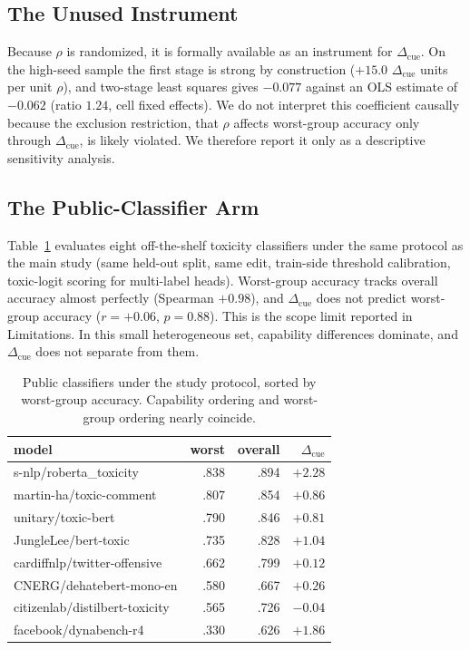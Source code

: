 \documentclass[11pt]{article}
\newcommand{\cued}{\ensuremath{\Delta_{\mathrm{cue}}}}
\begin{document}
\subsection{The Unused Instrument}
\label{app:iv}
Because $\rho$ is randomized, it is formally available as an instrument for
\cued{}. On the high-seed sample the first stage is strong by construction
($+15.0$ \cued{} units per unit $\rho$), and two-stage least squares gives
$-0.077$ against an OLS estimate of $-0.062$ (ratio $1.24$, cell fixed
effects). We do not interpret this coefficient causally because the exclusion
restriction, that $\rho$ affects worst-group accuracy only through \cued{}, is
likely violated. We therefore report it only as a descriptive sensitivity
analysis.

\subsection{The Public-Classifier Arm}
\label{app:public}
Table~\ref{tab:public} evaluates eight off-the-shelf toxicity classifiers
under the same protocol as the main study (same held-out split, same edit,
train-side threshold calibration, toxic-logit scoring for multi-label heads).
Worst-group accuracy tracks overall accuracy almost perfectly
(Spearman $+0.98$), and \cued{} does not predict worst-group accuracy
($r{=}{+}0.06$, $p{=}0.88$). This is the scope limit reported in
Limitations. In this small heterogeneous set, capability differences dominate, and \cued{}
does not separate from them.

\begin{table}[t]
\centering\small
\setlength{\tabcolsep}{4.5pt}
\begin{tabular}{lrrr}
\toprule
model & worst & overall & \cued{} \\
\midrule
s-nlp/roberta\_toxicity          & .838 & .894 & $+2.28$ \\
martin-ha/toxic-comment          & .807 & .854 & $+0.86$ \\
unitary/toxic-bert               & .790 & .846 & $+0.81$ \\
JungleLee/bert-toxic             & .735 & .828 & $+1.04$ \\
cardiffnlp/twitter-offensive     & .662 & .799 & $+0.12$ \\
CNERG/dehatebert-mono-en         & .580 & .667 & $+0.26$ \\
citizenlab/distilbert-toxicity   & .565 & .726 & $-0.04$ \\
facebook/dynabench-r4            & .330 & .626 & $+1.86$ \\
\bottomrule
\end{tabular}
\caption{Public classifiers under the study protocol, sorted by worst-group
accuracy. Capability ordering and worst-group ordering nearly coincide.}
\label{tab:public}
\end{table}
\end{document}
